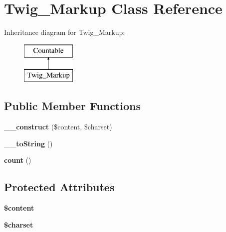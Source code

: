 \hypertarget{class_twig___markup}{}\section{Twig\+\_\+\+Markup Class Reference}
\label{class_twig___markup}
Inheritance diagram for Twig\+\_\+\+Markup\+:\begin{figure}[H]
\begin{center}
\leavevmode
\includegraphics[height=2.000000cm]{class_twig___markup}
\end{center}
\end{figure}
\subsection*{Public Member Functions}
\begin{DoxyCompactItemize}
\item 
\hypertarget{class_twig___markup_ab950404081182ce8442c56bb150116cb}{}{\bfseries \+\_\+\+\_\+construct} (\$content, \$charset)\label{class_twig___markup_ab950404081182ce8442c56bb150116cb}

\item 
\hypertarget{class_twig___markup_a7516ca30af0db3cdbf9a7739b48ce91d}{}{\bfseries \+\_\+\+\_\+to\+String} ()\label{class_twig___markup_a7516ca30af0db3cdbf9a7739b48ce91d}

\item 
\hypertarget{class_twig___markup_ac751e87b3d4c4bf2feb03bee8b092755}{}{\bfseries count} ()\label{class_twig___markup_ac751e87b3d4c4bf2feb03bee8b092755}

\end{DoxyCompactItemize}
\subsection*{Protected Attributes}
\begin{DoxyCompactItemize}
\item 
\hypertarget{class_twig___markup_a57b284fe00866494b33afa80ba729bed}{}{\bfseries \$content}\label{class_twig___markup_a57b284fe00866494b33afa80ba729bed}

\item 
\hypertarget{class_twig___markup_af10158dd74b75f1d337e83102d6b82ce}{}{\bfseries \$charset}\label{class_twig___markup_af10158dd74b75f1d337e83102d6b82ce}

\end{DoxyCompactItemize}


